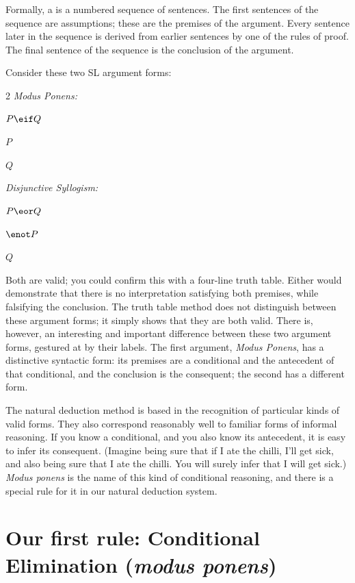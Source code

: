 Formally, a  is a numbered sequence of sentences. The first sentences of the sequence are assumptions; these are the premises of the argument. Every sentence later in the sequence is derived from earlier sentences by one of the rules of proof. The final sentence of the sequence is the conclusion of the argument.

Consider these two SL argument forms:

\begin{multicols}{2}
\emph{Modus Ponens:}
\begin{earg}
\item[] $P \eif Q$
\item[] $P$
\item[\therefore] $Q$
\end{earg}

\emph{Disjunctive Syllogism:}
\begin{earg}
\item[] $P \eor Q$
\item[] $\enot P$
\item[\therefore] $Q$
\end{earg}

\end{multicols}

Both are valid; you could confirm this with a four-line truth table. Either would demonstrate that there is no interpretation satisfying both premises, while falsifying the conclusion. The truth table method does not distinguish between these argument forms; it simply shows that they are both valid. There is, however, an interesting and important difference between these two argument forms, gestured at by their labels. The first argument, \emph{Modus Ponens}, has a distinctive syntactic form: its premises are a conditional and the antecedent of that conditional, and the conclusion is the consequent; the second has a different form.

The natural deduction method is based in the recognition of particular kinds of valid forms. They also correspond reasonably well to familiar forms of informal reasoning. If you know a conditional, and you also know its antecedent, it is easy to infer its consequent. (Imagine being sure that if I ate the chilli, I'll get sick, and also being sure that I ate the chilli. You will surely infer that I will get sick.) \emph{Modus ponens} is the name of this kind of conditional reasoning, and there is a special rule for it in our natural deduction system.

\section{Our first rule: Conditional Elimination (\emph{modus ponens})}

